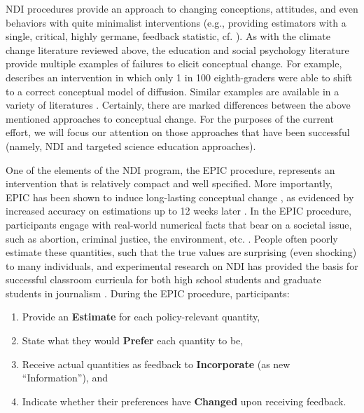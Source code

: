 NDI procedures \parencite[introduced by][]{ranney_numerically_2001_fixed} provide an
approach to changing conceptions, attitudes, and even behaviors with quite
minimalist interventions (e.g., providing estimators with a single, critical,
highly germane, feedback statistic, cf. ). As
with the climate change literature reviewed above, the
education and social psychology literature provide multiple examples of failures
to elicit conceptual change. For example, \textcite{chi_commonsense_2005} describes
an intervention in which only 1 in 100 eighth-graders were able to shift to a
correct conceptual model of diffusion. Similar examples are available in a
variety of literatures \parencite[cf.][]{disessa_what_1998, lord_biased_1979}.
Certainly, there are marked differences between the above mentioned approaches to
conceptual change. For the purposes of the current effort, we will focus our
attention on those approaches that have been successful (namely, NDI and
targeted science education approaches).

One of the elements of the NDI program, the EPIC procedure, represents an
intervention that is relatively compact and well specified. More importantly,
EPIC has been shown to induce long-lasting conceptual change
\parencite[e.g.,][]{ranney_designing_2008}, as evidenced by increased accuracy
on estimations up to 12 weeks later \parencite{munnich_longevities_2005}.  In
the EPIC procedure, participants engage with real-world numerical facts that
bear on a societal issue, such as abortion, criminal justice, the environment,
etc.  \parencite[e.g.,][]{garcia_de_osuna_qualitative_2004,munnich_policy_2003}.
People often poorly estimate these quantities, such that the true values are
surprising (even shocking) to many individuals, and experimental research on NDI
has provided the basis for successful classroom curricula for both high school
students and graduate students in journalism
\parencite{munnich_numerically-driven_2004,ranney_designing_2008}.  During the
EPIC procedure, participants:

\begin{enumerate}
\item Provide an \textbf{Estimate} for each policy-relevant quantity,
\item State what they would \textbf{Prefer} each quantity to be, 
\item Receive actual quantities as feedback to \textbf{Incorporate} (as new
``Information''), and 
\item Indicate whether their preferences have \textbf{Changed} upon receiving feedback.
\end{enumerate}

